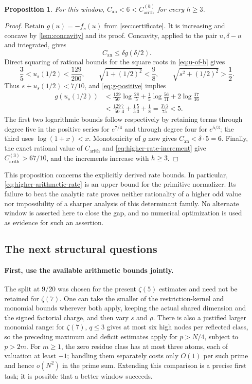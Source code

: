 \documentclass[11pt,letterpaper]{article}
\newtheorem{proposition}[proposition]{Proposition}
\theoremstyle{definition}
\newcommand{\arith}{\mathrm{arith}}
\newcommand{\an}{\mathrm{an}}
\begin{document}
\begin{proposition}\label{prop:higher-window-failure}
For this window, $C_{\an}<6<C_{\arith}^{(h)}$ for every $h\ge3$.
\end{proposition}
\begin{proof}
Retain $g(u)=-f_s(u)$ from \cref{sec:certificate}. It is increasing
and concave by \cref{lem:concavity} and its proof. Concavity, applied
to the pair $u,\delta-u$ and integrated, gives
\[
 C_{\an}\le\delta g(\delta/2).
\]
Direct squaring of rational bounds for the square roots in
\eqref{eq:u-of-b} gives
\[
 \frac35<u_s(1/2)<\frac{129}{200},\qquad
 \sqrt{1+(1/2)^2}<\frac98,\qquad
 \sqrt{s^2+(1/2)^2}>\frac12.
\]
Thus $s+u_s(1/2)<7/10$, and \eqref{eq:g-positive} implies
\begin{align*}
 g(u_s(1/2))
 &<\frac{129}{50}\log\frac{28}{5}
      +\frac15\log\frac{56}{11}+2\log\frac{17}{16}\\
 &<\frac{129}{50}\frac74+\frac15\frac53+\frac18
   =\frac{373}{75}<5.
\end{align*}
The first two logarithmic bounds follow respectively by retaining
terms through degree five in the positive series for $e^{7/4}$ and
through degree four for $e^{5/3}$; the third uses $\log(1+x)<x$.
Monotonicity of $g$ now gives $C_{\an}<\delta\cdot5=6$.
Finally, the exact rational value of $C_{\arith}$ and
\eqref{eq:higher-rate-increment} give
$C_{\arith}^{(3)}>67/10$, and the increments increase with $h\ge3$.
\end{proof}

This proposition concerns the explicitly derived rate bounds.
In particular, \eqref{eq:higher-arithmetic-rate} is an upper bound
for the primitive normalizer. Its failure to beat
the analytic rate proves neither rationality of a higher odd value
nor impossibility of a sharper analysis of this determinant family.
No alternate window is asserted here to close the gap, and no
numerical optimization is used as evidence for such an assertion.

\subsection{The next structural questions}

\paragraph{First, use the available arithmetic bounds jointly.}
The split at $9/20$ was chosen for the present $\zeta(5)$ estimates and need not be retained for $\zeta(7)$. One can take the smaller of
the restriction-kernel and monomial bounds wherever both apply,
keeping the actual shared dimension and the signed factorial charge,
and then vary $s$ and $\rho$. There is also a justified larger
monomial range: for $\zeta(7)$, $q\le3$ gives at most six high nodes
per reflected class, so the preceding maximum and deficit estimates
apply for $p>N/4$, subject to $p>2m$. For $m\ge1$, the zero residue class has at
most three atoms, each of valuation at least $-1$; handling them
separately costs only $O(1)$ per such prime and hence $o(N^2)$ in
the prime sum. Extending this comparison is a precise first task; it is possible that a better window succeeds.
\end{document}
